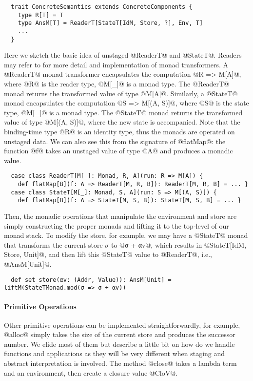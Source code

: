 \begin{lstlisting}
  trait ConcreteSemantics extends ConcreteComponents {
    type R[T] = T
    type AnsM[T] = ReaderT[StateT[IdM, Store, ?], Env, T]
    ...
  }
\end{lstlisting}

Here we sketch the basic idea of unstaged @ReaderT@ and @StateT@. Readers may
refer to \cite{DBLP:conf/popl/LiangHJ95, Chiusano:2014:FPS:2688794} for more detail 
and implementation of monad transformers.
A @ReaderT@ monad transformer encapsulates the computation @R => M[A]@, where
@R@ is the reader type, @M[_]@ is a monad type. The @ReaderT@ monad returns the
transformed value of type @M[A]@. Similarly, a @StateT@ monad encapsulates the
computation @S => M[(A, S)]@, where @S@ is the state type, @M[_]@ is a monad
type. The @StateT@ monad returns the transformed value of type @M[(A, S)]@,
where the new state is accompanied.
Note that the binding-time type @R@ is an identity type, thus the monads are
operated on unstaged data. We can also see this from the signature of @flatMap@:
the function @f@ takes an unstaged value of type @A@ and produces a monadic
value.

\begin{lstlisting}
  case class ReaderT[M[_]: Monad, R, A](run: R => M[A]) {
    def flatMap[B](f: A => ReaderT[M, R, B]): ReaderT[M, R, B] = ... }
  case class StateT[M[_]: Monad, S, A](run: S => M[(A, S)]) {
    def flatMap[B](f: A => StateT[M, S, B]): StateT[M, S, B] = ... }
\end{lstlisting}

Then, the monadic operations that manipulate the environment and store are
simply constructing the proper monads and lifting it to the top-level of our
monad stack. To modify the store, for example, we may have a @StateT@ monad that
transforms the current store $\sigma$ to @σ + αv@, which results in
@StateT[IdM, Store, Unit]@, and then lift this @StateT@ value to @ReaderT@,
i.e., @AnsM[Unit]@.
\begin{lstlisting}
  def set_store(αv: (Addr, Value)): AnsM[Unit] = liftM(StateTMonad.mod(σ => σ + αv))
\end{lstlisting}

\paragraph{Primitive Operations}
Other primitive operations can be implemented straightforwardly, for example,
@alloc@ simply takes the size of the current store and produces the successor number.
We elide most of them but describe a little bit on how do we handle functions
and applications as they will be very different when staging and abstract
interpretation is involved. The method @close@ takes a lambda term and an
environment, then create a closure value @CloV@.

